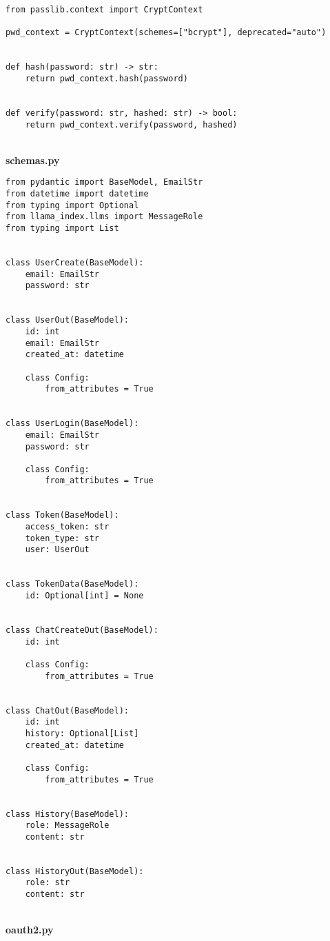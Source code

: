\begin{Verbatim}[breaklines=true, breakanywhere=true]
from passlib.context import CryptContext

pwd_context = CryptContext(schemes=["bcrypt"], deprecated="auto")


def hash(password: str) -> str:
    return pwd_context.hash(password)


def verify(password: str, hashed: str) -> bool:
    return pwd_context.verify(password, hashed)

\end{Verbatim}
\
\\
\textbf{schemas.py}

\begin{Verbatim}[breaklines=true, breakanywhere=true]
from pydantic import BaseModel, EmailStr
from datetime import datetime
from typing import Optional
from llama_index.llms import MessageRole
from typing import List


class UserCreate(BaseModel):
    email: EmailStr
    password: str


class UserOut(BaseModel):
    id: int
    email: EmailStr
    created_at: datetime

    class Config:
        from_attributes = True


class UserLogin(BaseModel):
    email: EmailStr
    password: str

    class Config:
        from_attributes = True


class Token(BaseModel):
    access_token: str
    token_type: str
    user: UserOut


class TokenData(BaseModel):
    id: Optional[int] = None


class ChatCreateOut(BaseModel):
    id: int

    class Config:
        from_attributes = True


class ChatOut(BaseModel):
    id: int
    history: Optional[List]
    created_at: datetime

    class Config:
        from_attributes = True


class History(BaseModel):
    role: MessageRole
    content: str


class HistoryOut(BaseModel):
    role: str
    content: str

\end{Verbatim}
\
\\
\textbf{oauth2.py}

